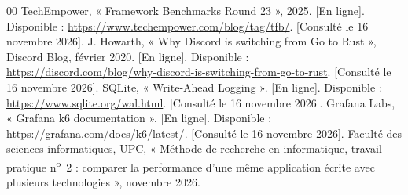 \documentclass[conference,a4paper]{IEEEtran}
\begin{document}
\begin{thebibliography}{00}
 TechEmpower, « Framework Benchmarks Round 23 »,
2025. [En ligne]. Disponible :
\url{https://www.techempower.com/blog/tag/tfb/}. [Consulté le 16 novembre 2026].
 J. Howarth, « Why Discord is switching from Go to
Rust », Discord Blog, février 2020. [En ligne]. Disponible :
\url{https://discord.com/blog/why-discord-is-switching-from-go-to-rust}.
[Consulté le 16 novembre 2026].
 SQLite, « Write-Ahead Logging ». [En ligne].
Disponible : \url{https://www.sqlite.org/wal.html}. [Consulté le
16 novembre 2026].
 Grafana Labs, « Grafana k6 documentation ». [En ligne].
Disponible : \url{https://grafana.com/docs/k6/latest/}. [Consulté le
16 novembre 2026].
 Faculté des sciences informatiques, UPC, « Méthode de
recherche en informatique, travail pratique n\textsuperscript{o}~2 :
comparer la performance d'une même application écrite avec plusieurs
technologies », novembre 2026.
\end{thebibliography}
\end{document}
